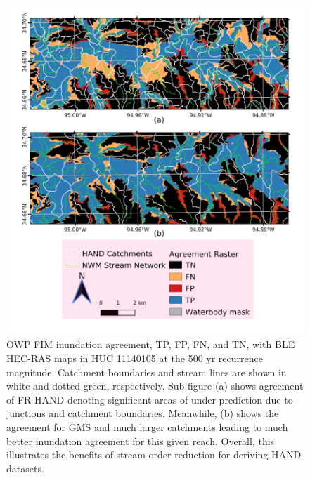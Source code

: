 \documentclass[draft]{dependencies/agujournal2019}
\begin{document}
%
%
\begin{figure}[H]
\centering
\includegraphics[scale=1.0]{figures/gms_enhancement.jpg}
\caption{OWP FIM inundation agreement, TP, FP, FN, and TN, with BLE HEC-RAS maps in HUC 11140105 at the 500 yr recurrence magnitude.
Catchment boundaries and stream lines are shown in white and dotted green, respectively.
Sub-figure (a) shows agreement of FR HAND denoting significant areas of under-prediction due to junctions and catchment boundaries.
Meanwhile, (b) shows the agreement for GMS and much larger catchments leading to much better inundation agreement for this given reach. 
Overall, this illustrates the benefits of stream order reduction for deriving HAND datasets.
}
\label{fig:gms_enhancement}
\end{figure}
%
\clearpage %
\end{document}
